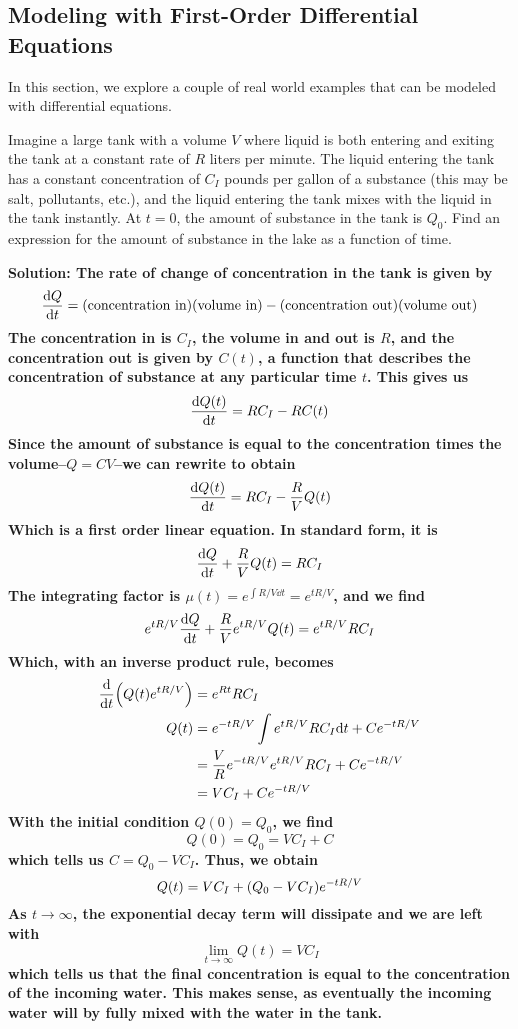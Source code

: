 \subsection{Modeling with First-Order Differential Equations}
In this section, we explore a couple of real world examples that can be modeled with differential equations.
\begin{example}
    Imagine a large tank with a volume $V$ where liquid is both entering and exiting the tank at a constant rate of $R$ liters per minute. The liquid entering the tank has a constant concentration of $C_I$ pounds per gallon of a substance (this may be salt, pollutants, etc.), and the liquid entering the tank mixes with the liquid in the tank instantly. At $t=0$, the amount of substance in the tank is $Q_0$. Find an expression for the amount of substance in the lake as a function of time. \par
    \bf{Solution:} The rate of change of concentration in the tank is given by
    \[ \dv{Q}{t} = (\text{concentration in})(\text{volume in}) - (\text{concentration out})(\text{volume out})\]
    The concentration in is $C_I$, the volume in and out is $R$, and the concentration out is given by $C(t)$, a function that describes the concentration of substance at any particular time $t$. This gives us
    \[ \dv{Q(t)}{t} = RC_I - RC(t)\]
    Since the amount of substance is equal to the concentration times the volume--$Q=CV$--we can rewrite to obtain
    \[ \dv{Q(t)}{t} = RC_I - \frac{R}{V}Q(t)\] 
    Which is a first order linear equation. In standard form, it is
    \[ \dv{Q}{t} + \frac{R}{V}Q(t) = RC_I\]
    The integrating factor is $\mu(t) = e^{\int R/V\dd t} = e^{tR/V}$, and we find
    \[ e^{tR/V}\dv{Q}{t} + \frac{R}{V}e^{tR/V}Q(t) = e^{tR/V}RC_I \]
    Which, with an inverse product rule, becomes
    \begin{align*}
        \dv{t}\pqty{Q(t)e^{tR/V}} &= e^{Rt}RC_I \\
        Q(t) &= e^{-tR/V}\int e^{tR/V}RC_I\dd t + Ce^{-tR/V}\\
        &= \frac{V}{R}e^{-tR/V}e^{tR/V}RC_I +Ce^{-tR/V}\\
        &= VC_I + Ce^{-tR/V}
    \end{align*}
    With the initial condition $Q(0)=Q_0$, we find
    \[ Q(0) = Q_0 = VC_I+C \]
    which tells us $C = Q_0 - VC_I$. Thus, we obtain
    \[ Q(t) = VC_I + \pqty{Q_0-VC_I}e^{-tR/V}\]
    As $t\to\infty$, the exponential decay term will dissipate and we are left with
    \[ \lim_{t\to\infty}Q(t) = VC_I \]
    which tells us that the final concentration is equal to the concentration of the incoming water. This makes sense, as eventually the incoming water will by fully mixed with the water in the tank. 
\end{example}
